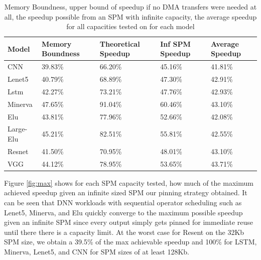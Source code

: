 \begin{table}[]
	\begin{tabular}{|l|l|l|l|l|}
		\hline
		Model     & Memory Boundness & Theoretical Speedup & Inf SPM Speedup & Average Speedup\\ \hline
		CNN       & 39.83\%          & 66.20\%             & 45.16\%              & 41.81\%        \\ \hline
		Lenet5    & 40.79\%          & 68.89\%             & 47.30\%              & 42.91\%        \\ \hline
		Lstm      & 42.27\%          & 73.21\%             & 47.76\%              & 42.93\%        \\ \hline
		Minerva   & 47.65\%          & 91.04\%             & 60.46\%              & 43.10\%        \\ \hline
		Elu       & 43.81\%          & 77.96\%             & 52.66\%              & 42.08\%        \\ \hline
		Large-Elu & 45.21\%          & 82.51\%             & 55.81\%              & 42.55\%        \\ \hline
		Resnet    & 41.50\%          & 70.95\%             & 48.01\%              & 43.10\%        \\ \hline
		VGG       & 44.12\%          & 78.95\%             & 53.65\%              & 43.71\%        \\ \hline
	\end{tabular}
	\caption{Memory Boundness, upper bound of speedup if no DMA transfers were needed at all, the speedup possible from an SPM with infinite capacity, the average
	speedup for all capacities tested on for each model}
	\label{tab:memory_bound}
\end{table}

Figure \ref{fig:max} shows for each SPM capacity tested, how much of the
maximum achieved speedup given an infinite sized SPM our pinning strategy
obtained. It can be seen that DNN workloads with sequential operator scheduling
such as Lenet5, Minerva, and Elu quickly converge to the maximum possible
speedup given an infinite SPM since every output simply gets pinned for
immediate reuse until there there is a capacity limit. At the worst case for Resent
on the 32Kb SPM size, we obtain a 39.5\% of the max achievable speedup and 100\% for
LSTM, Minerva, Lenet5, and CNN for SPM sizes of at least 128Kb.

